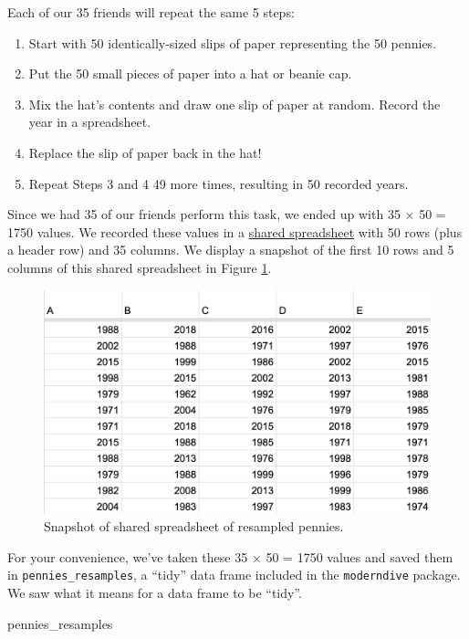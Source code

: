 \documentclass[
]{book}
\newenvironment{Shaded}{\begin{snugshade}}{\end{snugshade}}
\newcommand{\NormalTok}[1]{#1}
\providecommand{\tightlist}{%
  \setlength{\itemsep}{0pt}\setlength{\parskip}{0pt}}
\begin{document}
Each of our 35 friends will repeat the same 5 steps:

\begin{enumerate}
\def\labelenumi{\arabic{enumi}.}
\tightlist
\item
  Start with 50 identically-sized slips of paper representing the 50 pennies.
\item
  Put the 50 small pieces of paper into a hat or beanie cap.
\item
  Mix the hat's contents and draw one slip of paper at random. Record the year in a spreadsheet.
\item
  Replace the slip of paper back in the hat!
\item
  Repeat Steps 3 and 4 49 more times, resulting in 50 recorded years.
\end{enumerate}

Since we had 35 of our friends perform this task, we ended up with 35 \(\times\) 50 = 1750 values. We recorded these values in a \href{https://docs.google.com/spreadsheets/d/1y3kOsU_wDrDd5eiJbEtLeHT9L5SvpZb_TrzwFBsouk0/}{shared spreadsheet} with 50 rows (plus a header row) and 35 columns. We display a snapshot of the first 10 rows and 5 columns of this shared spreadsheet in Figure \ref{fig:tactile-resampling-5}.

\begin{figure}
\includegraphics[width=0.7\linewidth]{images/sampling/pennies/tactile_simulation/5_shared_spreadsheet} \caption{Snapshot of shared spreadsheet of resampled pennies.}\label{fig:tactile-resampling-5}
\end{figure}

For your convenience, we've taken these 35 \(\times\) 50 = 1750 values and saved them in \texttt{pennies\_resamples}, a ``tidy'' data frame included in the \texttt{moderndive} package. We saw what it means for a data frame to be ``tidy''.

\begin{Shaded}
\begin{Highlighting}[]
\NormalTok{pennies_resamples}
\end{Highlighting}
\end{Shaded}
\end{document}

